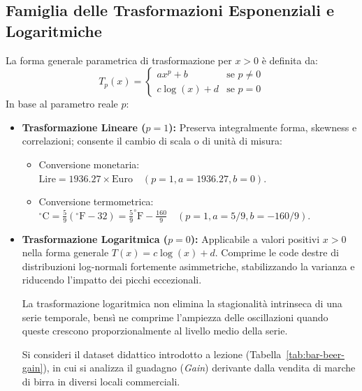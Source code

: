 \subsection{Famiglia delle Trasformazioni Esponenziali e Logaritmiche}
La forma generale parametrica di trasformazione per $x > 0$ è definita da:
\begin{equation}
T_p(x) = \begin{cases}
a x^p + b & \text{se } p \ne 0 \\
c \log(x) + d & \text{se } p = 0
\end{cases}
\end{equation}
In base al parametro reale $p$:
\begin{itemize}
    \item \textbf{Trasformazione Lineare ($p=1$):} Preserva integralmente forma, skewness e correlazioni; consente il cambio di scala o di unità di misura:
    \begin{itemize}
        \item Conversione monetaria: $\text{Lire} = 1936.27 \times \text{Euro} \quad (p=1, a=1936.27, b=0)$.
        \item Conversione termometrica: $^\circ\text{C} = \frac{5}{9}(^\circ\text{F} - 32) = \frac{5}{9}^\circ\text{F} - \frac{160}{9} \quad (p=1, a=5/9, b=-160/9)$.
    \end{itemize}
    \item \textbf{Trasformazione Logaritmica ($p=0$):} Applicabile a valori positivi $x > 0$ nella forma generale $T(x) = c \log(x) + d$. Comprime le code destre di distribuzioni log-normali fortemente asimmetriche, stabilizzando la varianza e riducendo l'impatto dei picchi eccezionali.
    \begin{remark}
    La trasformazione logaritmica non elimina la stagionalità intrinseca di una serie temporale, bensì ne comprime l'ampiezza delle oscillazioni quando queste crescono proporzionalmente al livello medio della serie.
    \end{remark}

    \begin{example}
    Si consideri il dataset didattico introdotto a lezione (Tabella~\ref{tab:bar-beer-gain}), in cui si analizza il guadagno (\textit{Gain}) derivante dalla vendita di marche di birra in diversi locali commerciali.


\end{example}
\end{itemize}
